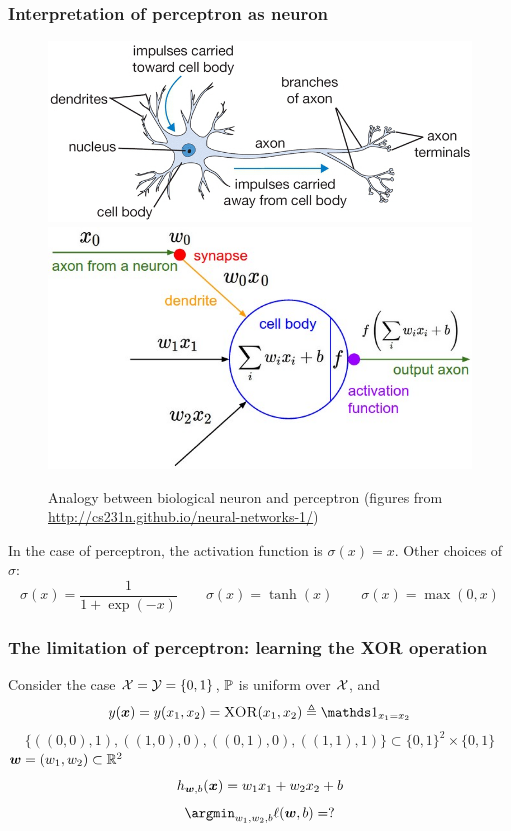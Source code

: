 \documentclass{article}
\newcommand{\ind}{{\mathds 1}}
\begin{document}
\subsubsection{Interpretation of perceptron as neuron}

\begin{figure}
\centering
\includegraphics[scale=0.2, valign=t]{neuron}
\includegraphics[scale=0.2, valign=t]{neuron_model}
\caption{Analogy between biological neuron and perceptron (figures from \url{http://cs231n.github.io/neural-networks-1/})}
\end{figure}

In the case of perceptron, the activation function is $\sigma (x) = x$.
Other choices of $\sigma$:
\[
\sigma (x) = \frac1{1 + \exp (-x)} \qquad
\sigma (x) = \tanh (x) \qquad
\sigma (x) = \max (0, x)
\]

\subsubsection{The limitation of perceptron: learning the \textsc{XOR} operation}

Consider the case ${\mathcal X} = {\mathcal Y} = \{0, 1\}$, ${\mathbb P}$ is uniform over ${\mathcal X}$, and
\[
y(\bmx)
= y(x_1, x_2)
= \textsc{XOR} (x_1, x_2) \triangleq \ind_{x_1 = x_2}
\]
\[
\{((0, 0), 1), ((1, 0), 0), ((0, 1), 0), ((1, 1), 1)\} \subset \{0, 1\}^2 \times \{0, 1\}
\]
${\bm w} = (w_1, w_2) \subset {\mathbb R}^2$
\[
h_{{\bm w}, b} ({\bm x}) = w_1 x_1 + w_2 x_2 + b
\]
\[
\argmin_{w_1, w_2, b} \ell (\bmw, b) = ?
\]
\end{document}
